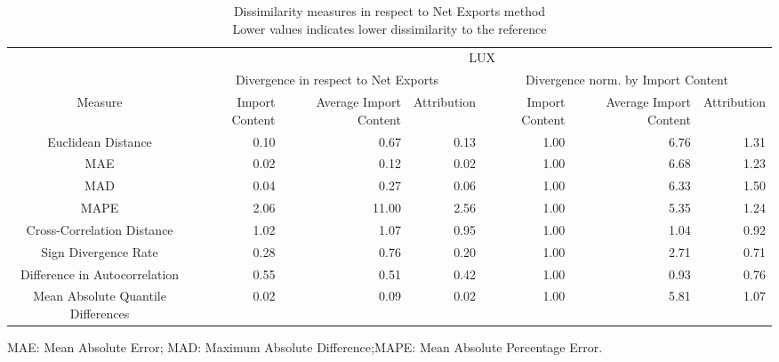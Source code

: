 \begin{table}[t]
\caption*{
{\large Dissimilarity measures in respect to Net Exports method} \\ 
{\small Lower values indicates lower dissimilarity to the reference}
} 
\fontsize{15.0pt}{18.0pt}\selectfont
\begin{tabular*}{\linewidth}{@{\extracolsep{\fill}}crrrrrr}
\toprule
 & \multicolumn{6}{c}{LUX} \\ 
\cmidrule(lr){2-7}
 & \multicolumn{3}{c}{Divergence in respect to Net Exports} & \multicolumn{3}{c}{Divergence norm. by Import Content} \\ 
\cmidrule(lr){2-4} \cmidrule(lr){5-7}
Measure & Import Content & Average Import Content & Attribution & Import Content & Average Import Content & Attribution \\ 
\midrule\addlinespace[2.5pt]
Euclidean Distance & 0.10 & 0.67 & 0.13 & 1.00 & 6.76 & 1.31 \\ 
MAE & 0.02 & 0.12 & 0.02 & 1.00 & 6.68 & 1.23 \\ 
MAD & 0.04 & 0.27 & 0.06 & 1.00 & 6.33 & 1.50 \\ 
MAPE & 2.06 & 11.00 & 2.56 & 1.00 & 5.35 & 1.24 \\ 
Cross-Correlation Distance & 1.02 & 1.07 & 0.95 & 1.00 & 1.04 & 0.92 \\ 
Sign Divergence Rate & 0.28 & 0.76 & 0.20 & 1.00 & 2.71 & 0.71 \\ 
Difference in Autocorrelation & 0.55 & 0.51 & 0.42 & 1.00 & 0.93 & 0.76 \\ 
Mean Absolute Quantile Differences & 0.02 & 0.09 & 0.02 & 1.00 & 5.81 & 1.07 \\ 
\bottomrule
\end{tabular*}
\begin{minipage}{\linewidth}
MAE: Mean Absolute Error; MAD: Maximum Absolute Difference;MAPE: Mean Absolute Percentage Error.\\
\end{minipage}
\end{table}

